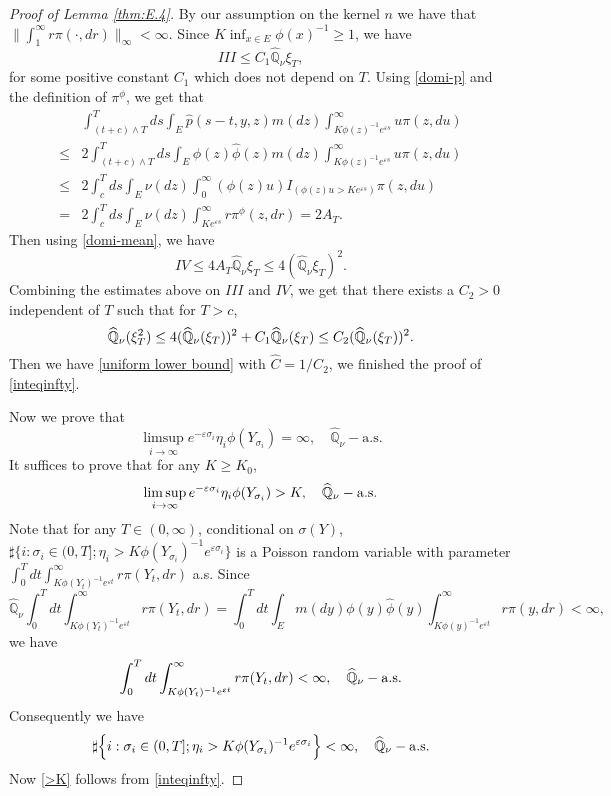 \documentclass[12pt,a4paper]{amsart}
\numberwithin{equation}{section}
\theoremstyle{plain}
\theoremstyle{definition}
\theoremstyle{remark}
\begin{document}
\begin{proof}[Proof of Lemma \ref{thm:E.4}]
By our assumption on the kernel $n$ we have that $ \|\int_1^\infty r\pi(\cdot,dr)\|_{\infty}<\infty$. Since $K\inf_{x\in
E}\phi(x)^{-1}\ge 1$,  we have
$$
III\leq C_1\widehat{\mathbb Q}_{\nu}\xi_T,
$$
for some positive constant $ C_1$ which does not depend on $T$.
Using \eqref{domi-p} and the definition of $\pi^{\phi}$, we get that
$$
\begin{array}{rl}
&\displaystyle\int_{(t+c)\wedge T}^Tds\int_E\hat p(s-t,y,z)m(dz)\int_{K\phi(z)^{-1}e^{\varepsilon s}}^\infty u \pi(z,du)\\
\le&\displaystyle 2\int_{(t+c)\wedge T}^Tds\int_E\phi(z)\widehat\phi(z)m(dz)\int_{K\phi(z)^{-1}e^{\varepsilon s}}^\infty u \pi(z, du)\\
\le&\displaystyle 2\int_{c}^Tds\int_E\nu(dz)\int_{0}^\infty(\phi(z)u)I_{(\phi(z)u>Ke^{\varepsilon s})} \pi(z, du)\\
=&\displaystyle 2\int_{c}^Tds\int_E\nu(dz)\int_{Ke^{\varepsilon s}}^\infty r \pi^{\phi}(z, dr)=2A_T.
\end{array}
$$
Then using \eqref{domi-mean},  we have
$$
IV\leq 4 A_T\widehat{\mathbb Q}_{\nu}\xi_T\leq 4 (\widehat{\mathbb Q}_{\nu}
\xi_T)^2.
$$
Combining the estimates above on $III$ and $IV$, we get that there
exists a $C_2>0$ independent of $T$ such that for $T>c$,
$$
\widehat{\mathbb Q}_{\nu}(\xi_T^2)\le 4{\color{red}}
(\widehat{\mathbb Q}_{\nu}(\xi_T))^2+ C_1\widehat{\mathbb Q}_{\nu}(\xi_T)\le
C_2(\widehat{\mathbb Q}_{\nu}(\xi_T))^2.
$$
Then we have \eqref{uniform lower bound} with $\widehat C=1/C_2$, we finished the proof of
\eqref{inteqinfty}.

Now we prove that
$$
\limsup_{i\rightarrow\infty}e^{-\varepsilon\sigma_i}
\eta_i\phi(Y_{\sigma_i})=\infty,\quad
\widehat{\mathbb Q}_{\nu}-\mbox{a.s.}
$$
It suffices to prove that for any $K\geq K_0$,
\begin{equation}\label{>K}
\limsup_{i\rightarrow\infty}e^{-\varepsilon\sigma_i}
\eta_i\phi(Y_{\sigma_i})>K,\quad \widehat{\mathbb Q}_{\nu}-{\rm
a.s.}
\end{equation}
Note that for any $T\in (0,\infty)$, conditional on
$\sigma(Y)$, $\sharp\{i: \sigma_i\in(0, T];
\eta_i>K\phi(Y_{\sigma_i})^{-1}e^{\varepsilon\sigma_i}\}$
is a Poisson random variable with parameter $\int_0^Tdt
\int_{K\phi(Y_t)^{-1}e^{\varepsilon t}}^\infty r \pi(Y_t, dr)$ a.s. Since
$$
\widehat{\mathbb Q}_{\nu}\int_0^Tdt\int_{K\phi(
Y_t)^{-1}e^{\varepsilon t}}^\infty r\pi(Y_t,dr)
=\int^T_0dt\int_Em(dy)\phi(y)\widehat \phi(y)\int_{K\phi(y)^{-1}e^{\varepsilon t}}^\infty r\pi(y, dr)
<\infty,
$$
we have
$$
\int_0^Tdt\int_{K\phi (Y_t)^{-1}e^{\varepsilon t}}^\infty r\pi(Y_t, dr) <\infty,\quad \widehat{\mathbb Q}_{\nu}-{\rm a.s.}
$$
Consequently we have
\begin{equation}\label{number-finite}
\sharp\Big\{i: \sigma_i\in(0,T];
\eta_i>K\phi(Y_{\sigma_i})^{-1}e^{\varepsilon\sigma_i}\Big\}<\infty,\quad
\widehat{\mathbb Q}_{\nu}-{\rm a.s.}
\end{equation}
Now \eqref{>K} follows from \eqref{inteqinfty}.

\end{proof}
\end{document}
